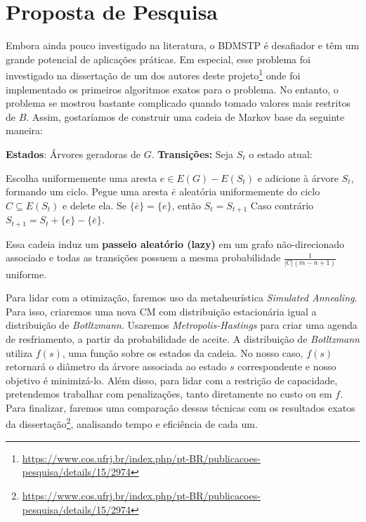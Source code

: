 \documentclass[12pt]{article}
\begin{document}
\section{Proposta de Pesquisa}

Embora ainda pouco investigado na literatura, o BDMSTP é desafiador e têm um grande potencial de aplicações práticas. Em especial, esse problema foi investigado na dissertação de um dos autores deste projeto\footnote{\url{https://www.cos.ufrj.br/index.php/pt-BR/publicacoes-pesquisa/details/15/2974}} onde foi implementado os primeiros algoritmos exatos para o problema. No entanto, o problema se mostrou bastante complicado quando tomado valores mais restritos de $B$. Assim, gostaríamos de construir uma cadeia de Markov base da seguinte maneira: 

\begin{outline}
	\1 \textbf{Estados}:
		\2 Árvores geradoras de $G$. 
	\1 \textbf{Transições:} 
		\2 Seja $S_t$ o estado atual:
	
			\3 Escolha uniformemente uma aresta $e \in E(G)-E(S_t)$ e adicione à árvore $S_t$, formando um ciclo.
			\3 Pegue uma aresta $\bar{e}$ aleatória uniformemente do ciclo $C \subseteq E(S_t)$ e delete ela. 
			\3 Se $\{\bar{e}\} = \{e\}$, então $S_t = S_{t+1}$
			\3 Caso contrário $S_{t+1} = S_t + \{e\} - \{\bar{e}\}$.
\end{outline}

Essa cadeia induz um \textbf{passeio aleatório (lazy)} em um grafo não-direcionado associado e todas as transições possuem a mesma probabilidade $\frac{1}{|C|(m-n+1)}$ uniforme. 

Para lidar com a otimização, faremos uso da metaheurística \textit{Simulated Annealing}. Para isso, criaremos uma nova CM com distribuição estacionária igual a distribuição de \textit{Botltzmann}. Usaremos \textit{Metropolis-Hastings} para criar uma agenda de resfriamento, a partir da probabilidade de aceite. A distribuição de \textit{Botltzmann} utiliza $f(s)$, uma função sobre os estados da cadeia. No nosso caso, $f(s)$ retornará o diâmetro da árvore associada ao estado $s$ correspondente e nosso objetivo é minimizá-lo. Além disso, para lidar com a restrição de capacidade, pretendemos trabalhar com penalizações, tanto diretamente no custo ou em $f$. Para finalizar, faremos uma comparação dessas técnicas com os resultados exatos da dissertação\footnote{\url{https://www.cos.ufrj.br/index.php/pt-BR/publicacoes-pesquisa/details/15/2974}}, analisando tempo e eficiência de cada um. 
\end{document}
